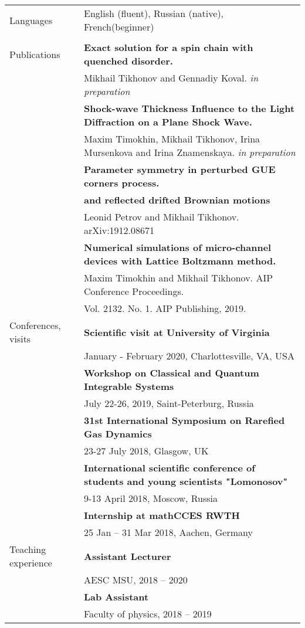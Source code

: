 \documentclass[letterpaper,10pt,oneside,utf8]{article}
\begin{document}
\begin{tabular}{@{} l l}
		
	
		\Large{Languages}   & English (fluent), Russian (native), French(beginner) \\
        
        &\\
		\Large{Publications}  
		&\textbf{Exact solution for a spin chain with quenched disorder. }\\&  Mikhail Tikhonov and Gennadiy Koval. \textit{in preparation} \\
		&\textbf{Shock-wave Thickness Influence to the Light Diffraction on a Plane Shock Wave.}\\&
		Maxim Timokhin, Mikhail Tikhonov, Irina Mursenkova and Irina Znamenskaya. \textit{in preparation}\\
		&\textbf{Parameter symmetry in perturbed GUE corners process.	}\\&\textbf{and reflected drifted Brownian motions}\\& Leonid Petrov and  Mikhail Tikhonov. arXiv:1912.08671\\
		&\textbf{Numerical simulations of micro-channel devices with Lattice Boltzmann method. }\\
		&Maxim Timokhin  and Mikhail Tikhonov. AIP Conference Proceedings. \\
		&Vol. 2132. No. 1. AIP Publishing, 2019.\\
		\Large{Conferences, visits} 
		&\textbf{Scientific visit at University of Virginia}\\
		& January - February 2020, Charlottesville, VA, USA  \\
		&\textbf{Workshop on Classical and Quantum Integrable Systems}\\
		&July 22-26, 2019, Saint-Peterburg, Russia\\
		& \textbf{31st International Symposium on Rarefied Gas Dynamics}\\
		& 23-27 July 2018, Glasgow, UK\\
		&\textbf{International scientific conference of students and young scientists "Lomonosov"}\\
		& 9-13 April 2018,  Moscow, Russia\\
		&\textbf{Internship at mathCCES RWTH}\\
		& 25 Jan -- 31 Mar 2018, Aachen, Germany \\

		\Large{Teaching experience}&
		\textbf{Assistant Lecturer}\\
		&AESC MSU, 2018 -- 2020\\
		&\textbf{Lab Assistant}\\
		&Faculty of physics, 2018 -- 2019\\

		
		
	\end{tabular}
	
\end{document}
